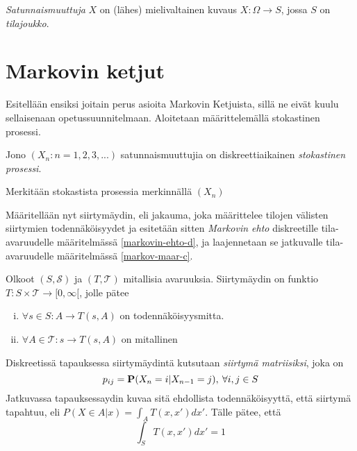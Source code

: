 \begin{maar}
	\textit{Satunnaismuuttuja} $X$ on (lähes) mielivaltainen kuvaus $X:\Omega\rightarrow S$, jossa $S$ on \textit{tilajoukko}. 
\end{maar}


\section{Markovin ketjut}

Esitellään ensiksi joitain perus asioita Markovin Ketjuista, sillä ne eivät kuulu sellaisenaan opetussuunnitelmaan. Aloitetaan määrittelemällä stokastinen prosessi.

\begin{maar}
	Jono $(X_n:n=1,2,3,...)$ satunnaismuuttujia on diskreettiaikainen \textit{stokastinen prosessi}.
\end{maar}

\begin{merk}
	Merkitään stokastista prosessia merkinnällä $( X_n )$
\end{merk}

Määritellään nyt siirtymäydin, eli jakauma, joka määrittelee tilojen välisten siirtymien todennäköisyydet ja esitetään sitten \textit{Markovin ehto} diskreetille tila-avaruudelle määritelmässä \ref{markovin-ehto-d}, ja laajennetaan se jatkuvalle tila-avaruudelle määritelmässä \ref{markov-maar-c}.

\begin{maar}
	Olkoot $(S,\mathcal{S})$ ja $(T,\mathcal{T})$ mitallisia avaruuksia. Siirtymäydin on funktio $T:S\times \mathcal{T} \rightarrow [0,\infty[$, jolle pätee
	\begin{enumerate}[(i)]
		\item $\forall s \in S: A \rightarrow T(s,A)$ on todennäköisyysmitta.
		\item $\forall A \in \mathcal{T}: s \rightarrow T(s,A)$ on mitallinen
	\end{enumerate}
	Diskreetissä tapauksessa siirtymäydintä kutsutaan \textit{siirtymä matriisiksi}, joka on 
	\begin{equation}
		p_{ij} = \textbf{P}(X_n = i | X_{n-1} = j), \:\forall i,j \in S
	\end{equation}
	Jatkuvassa tapauksessaydin kuvaa sitä ehdollista todennäköisyyttä, että siirtymä tapahtuu, eli $P(X \in A|x) = \int_A T(x,x')dx'$. Tälle pätee, että 
	\begin{equation}\label{siirt-tiheys}
		\int_S T(x,x')dx' = 1
	\end{equation}
\end{maar}

